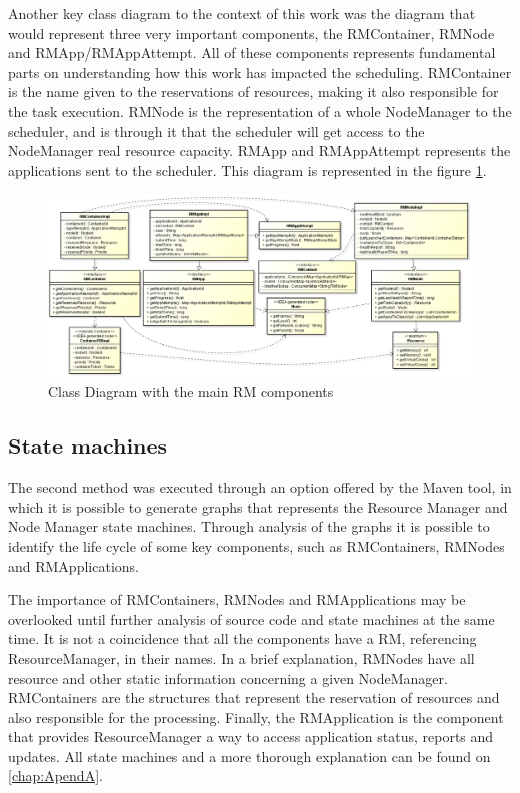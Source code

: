 Another key class diagram to the context of this work was the diagram that would represent three very important components, the RMContainer, RMNode and RMApp/RMAppAttempt. All of these components represents fundamental parts on understanding how this work has impacted the scheduling. RMContainer is the name given to the reservations of resources, making it also responsible for the task execution. RMNode is the representation of a whole NodeManager to the scheduler, and is through it that the scheduler will get access to the NodeManager real resource capacity. RMApp and RMAppAttempt represents the applications sent to the scheduler. This diagram is represented in the figure \ref{fig:RMComponents}.

\begin{figure}[hbtn]
   \renewcommand{\figurename}{Figure}
   \centering
   \includegraphics[width=15cm]{figuras/Figura13-RMComponents.png}
   \caption{Class Diagram with the main RM components}
   \label{fig:RMComponents}
\end{figure}

\subsection{State machines}

The second method was executed through an option offered by the Maven tool, in which it is possible to generate graphs that represents the Resource Manager and Node Manager state machines. Through analysis of the graphs it is possible to identify the life cycle of some key components, such as RMContainers, RMNodes and RMApplications. 

The importance of RMContainers, RMNodes and RMApplications may be overlooked until further analysis of source code and state machines at the same time. It is not a coincidence that all the components have a RM, referencing ResourceManager, in their names. In a brief explanation, RMNodes have all resource and other static information concerning a given NodeManager. RMContainers are the structures that represent the reservation of resources and also responsible for the processing. Finally, the RMApplication is the component that provides ResourceManager a way to access application status, reports and updates. All state machines and a more thorough explanation can be found on \autoref{chap:ApendA}.


